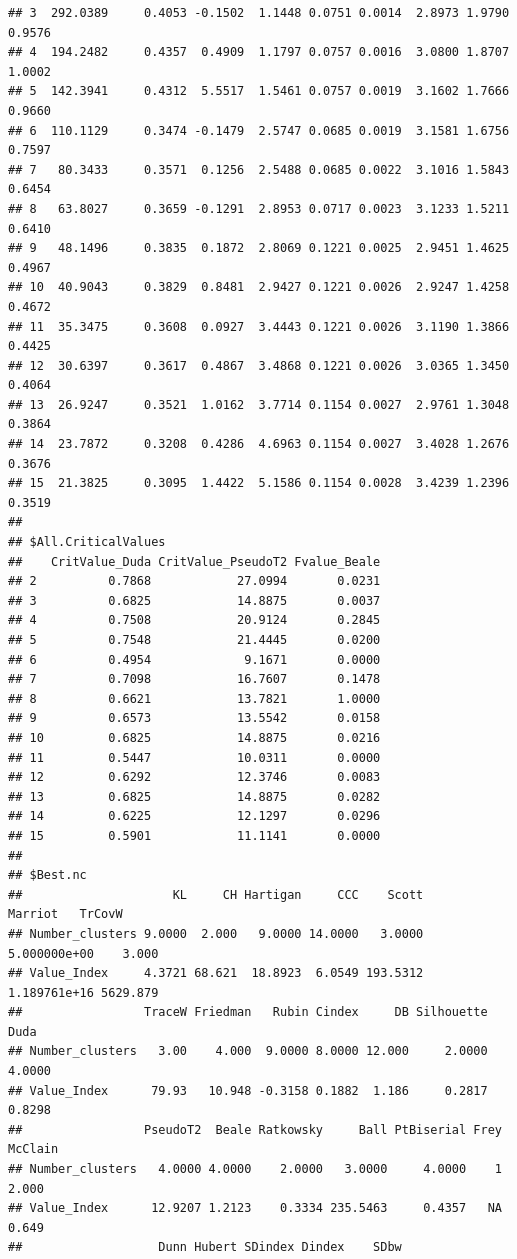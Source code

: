 \documentclass[
]{article}
\begin{document}
\begin{verbatim}
## 3  292.0389     0.4053 -0.1502  1.1448 0.0751 0.0014  2.8973 1.9790 0.9576
## 4  194.2482     0.4357  0.4909  1.1797 0.0757 0.0016  3.0800 1.8707 1.0002
## 5  142.3941     0.4312  5.5517  1.5461 0.0757 0.0019  3.1602 1.7666 0.9660
## 6  110.1129     0.3474 -0.1479  2.5747 0.0685 0.0019  3.1581 1.6756 0.7597
## 7   80.3433     0.3571  0.1256  2.5488 0.0685 0.0022  3.1016 1.5843 0.6454
## 8   63.8027     0.3659 -0.1291  2.8953 0.0717 0.0023  3.1233 1.5211 0.6410
## 9   48.1496     0.3835  0.1872  2.8069 0.1221 0.0025  2.9451 1.4625 0.4967
## 10  40.9043     0.3829  0.8481  2.9427 0.1221 0.0026  2.9247 1.4258 0.4672
## 11  35.3475     0.3608  0.0927  3.4443 0.1221 0.0026  3.1190 1.3866 0.4425
## 12  30.6397     0.3617  0.4867  3.4868 0.1221 0.0026  3.0365 1.3450 0.4064
## 13  26.9247     0.3521  1.0162  3.7714 0.1154 0.0027  2.9761 1.3048 0.3864
## 14  23.7872     0.3208  0.4286  4.6963 0.1154 0.0027  3.4028 1.2676 0.3676
## 15  21.3825     0.3095  1.4422  5.1586 0.1154 0.0028  3.4239 1.2396 0.3519
## 
## $All.CriticalValues
##    CritValue_Duda CritValue_PseudoT2 Fvalue_Beale
## 2          0.7868            27.0994       0.0231
## 3          0.6825            14.8875       0.0037
## 4          0.7508            20.9124       0.2845
## 5          0.7548            21.4445       0.0200
## 6          0.4954             9.1671       0.0000
## 7          0.7098            16.7607       0.1478
## 8          0.6621            13.7821       1.0000
## 9          0.6573            13.5542       0.0158
## 10         0.6825            14.8875       0.0216
## 11         0.5447            10.0311       0.0000
## 12         0.6292            12.3746       0.0083
## 13         0.6825            14.8875       0.0282
## 14         0.6225            12.1297       0.0296
## 15         0.5901            11.1141       0.0000
## 
## $Best.nc
##                     KL     CH Hartigan     CCC    Scott      Marriot   TrCovW
## Number_clusters 9.0000  2.000   9.0000 14.0000   3.0000 5.000000e+00    3.000
## Value_Index     4.3721 68.621  18.8923  6.0549 193.5312 1.189761e+16 5629.879
##                 TraceW Friedman   Rubin Cindex     DB Silhouette   Duda
## Number_clusters   3.00    4.000  9.0000 8.0000 12.000     2.0000 4.0000
## Value_Index      79.93   10.948 -0.3158 0.1882  1.186     0.2817 0.8298
##                 PseudoT2  Beale Ratkowsky     Ball PtBiserial Frey McClain
## Number_clusters   4.0000 4.0000    2.0000   3.0000     4.0000    1   2.000
## Value_Index      12.9207 1.2123    0.3334 235.5463     0.4357   NA   0.649
##                   Dunn Hubert SDindex Dindex    SDbw

\end{verbatim}
\end{document}
